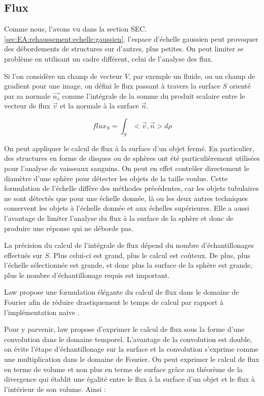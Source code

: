 \subsection{Flux}
\label{sec:EA:rehaussement:echelle:flux}

Comme nous, l'avons vu dans la section SEC. \ref{sec:EA:rehaussement:echelle:gaussien}, l'espace d'échelle gaussien peut provoquer des débordements de structures sur d'autres, plus petites. On peut limiter se problème en utilisant un cadre différent, celui de l'analyse des flux.

Si l'on considère un champ de vecteur $V$, par exemple un fluide, ou un champ de gradient pour une image, on défini le flux passant à travers la surface $S$ orienté par sa normale $\vec{n_s}$ comme l'intégrale de la somme du produit scalaire entre le vecteur de flux $\vec{v}$ et la normale à la surface $\vec{n}$.

\begin{equation}
flux_S = \int_{S}< \vec{v},\vec{n} > d\rho
\end{equation}

On peut appliquer le calcul de flux à la surface d'un objet fermé. En particulier, des structures en forme de disques ou de sphères ont été particulièrement utilisées pour l'analyse de vaisseaux sanguins. On peut en effet contrôler directement le diamètre d'une sphère pour détecter les objets de la taille voulue. Cette formulation de l'échelle diffère des méthodes précédentes, car les objets tubulaires ne sont détectés que pour une échelle donnée, là ou les deux autres techniques conservent les objets à l'échelle donnée et aux échelles supérieures. Elle a aussi l'avantage de limiter l'analyse du flux à la surface de la sphère et donc de produire une réponse qui ne déborde pas.

La précision du calcul de l'intégrale de flux dépend du nombre d'échantillonages effectués sur $S$. Plus celui-ci est grand, plus le calcul est coûteux. De plus, plus l'échelle sélectionnée est grande, et donc plus la surface de la sphère est grande, plus le nombre d'échantillonage requis est important.

Law propose une formulation élégante du calcul de flux dans le domaine de Fourier afin de réduire drastiquement le temps de calcul par rapport à l'implémentation naïve \cite{law2009_efficient_implementation}.

Pour y parvenir, law propose d'exprimer le calcul de flux sous la forme d'une convolution dans le domaine temporel. L'avantage de la convolution est double, on évite l'étape d'échantillonage sur la surface et la convolution s'exprime comme une multiplication dans le domaine de Fourier. On peut exprimer le calcul de flux en terme de volume et non plus en terme de surface grâce au théorème de la divergence qui établit une égalité entre le flux à la surface d'un objet et le flux à l'intérieur de son volume. Ainsi :

